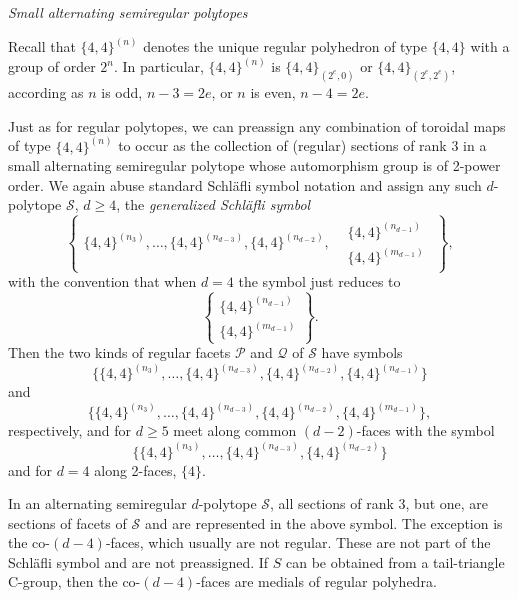\documentclass[12pt]{amsart}
\theoremstyle{definition}
\begin{document}
\noindent
{\it Small alternating semiregular polytopes}
\medskip

Recall that $\{4,4\}^{(n)}$ denotes the unique regular polyhedron of type $\{4,4\}$ with a group of order $2^n$. In particular, $\{4,4\}^{(n)}$ is $\{4,4\}_{(2^e,0)}$ or $\{4,4\}_{(2^e,2^e)}$, according as $n$ is odd, $n-3=2e$, or $n$ is even, $n-4=2e$.

Just as for regular polytopes, we can preassign any combination of toroidal maps of type $\{4,4\}^{(n)}$ to occur as the collection of (regular) sections of rank 3 in a small alternating semiregular polytope whose automorphism group is of 2-power order. We again abuse standard Schl\"afli symbol notation and assign any such $d$-polytope $\mathcal S$, $d\geq 4$, the \textit{generalized Schl\"afli symbol}
\begin{equation}
\label{all4stypessemi}
\left\{\!\!\begin{array}{rl}
\{4,4\}^{(n_3)},\ldots,\{4,4\}^{(n_{d-3})},\{4,4\}^{(n_{d-2})},
&\!\!\!\!\!\!\begin{array}{l}
\{4,4\}^{(n_{d-1})}\\[.1in]
\{4,4\}^{(m_{d-1})}
\end{array}
\end{array}\!\!\!\!\!\right\},
\end{equation}
with the convention that when $d=4$ the symbol just reduces to  
\[\left\{\!\!\begin{array}{l}
\{4,4\}^{(n_{d-1})}\\[.1in]
\{4,4\}^{(m_{d-1})}
\end{array}\!\!\!\right\}.\]
Then the two kinds of regular facets $\mathcal P$ and $\mathcal Q$ of $\mathcal{S}$ have symbols 
\[\{\{4,4\}^{(n_3)},\ldots,\{4,4\}^{(n_{d-3})},\{4,4\}^{(n_{d-2})},\{4,4\}^{(n_{d-1})}\}\]
and 
\[\{\{4,4\}^{(n_3)},\ldots,\{4,4\}^{(n_{d-3})},\{4,4\}^{(n_{d-2})},\{4,4\}^{(m_{d-1})}\},\]
respectively, and for $d\geq 5$ meet along common $(d-2)$-faces with the symbol
\[\{\{4,4\}^{(n_3)},\ldots,\{4,4\}^{(n_{d-3})},\{4,4\}^{(n_{d-2})}\}\]
and for $d=4$ along 2-faces, $\{4\}$. 

In an alternating semiregular $d$-polytope $\mathcal S$, all sections of rank $3$, but one, are sections of facets of $\mathcal{S}$ and are represented in the above symbol. The exception is the co-$(d-4)$-faces, which usually are not regular. These are not part of the Schl\"afli symbol and are not preassigned. If $S$ can be obtained from a tail-triangle C-group, then the co-$(d-4)$-faces are medials of regular polyhedra.
\end{document}
